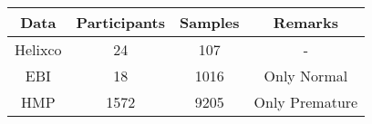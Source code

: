 \begin{tabular}{c|ccc}
    Data & Participants & Samples & Remarks \\ \hline
    Helixco & 24 & 107 & - \\
    EBI & 18 & 1016 & Only Normal \\
    HMP & 1572 & 9205 & Only Premature \\
\end{tabular}
